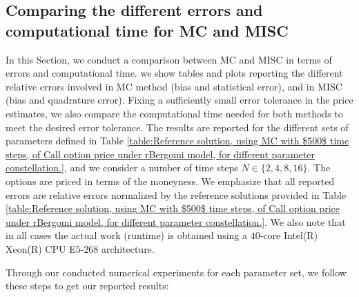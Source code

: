 



\subsection{Comparing the different  errors and computational time for MC and MISC}\label{sec:Comparing different  errors and complexity for MC and MISC}



In this Section, we conduct a comparison between MC and MISC in terms of errors and computational time. we show tables and plots reporting  the different relative errors involved in MC method (bias and statistical error), and in MISC (bias and quadrature error).  Fixing a  sufficiently small error tolerance in the price estimates,  we also compare the computational time needed for both methods to meet the desired error tolerance. The results are reported for the different sets of parameters defined in Table \ref{table:Reference solution, using MC with $500$ time steps, of Call option price under rBergomi model, for different parameter constellation.}, and we consider   a number of time steps $N \in \{2,4,8,16\}$.  The options are priced in terms of the moneyness.  We emphasize that all reported errors are relative errors normalized by the reference solutions provided in Table \ref{table:Reference solution, using MC with $500$ time steps, of Call option price under rBergomi model, for different parameter constellation.}. We also note that  in all cases the actual work (runtime) is obtained using a $40$-core Intel(R) Xeon(R) CPU E$5$-$268$ architecture. 


Through our conducted numerical experiments for each parameter set, we follow these steps to get our reported results:

